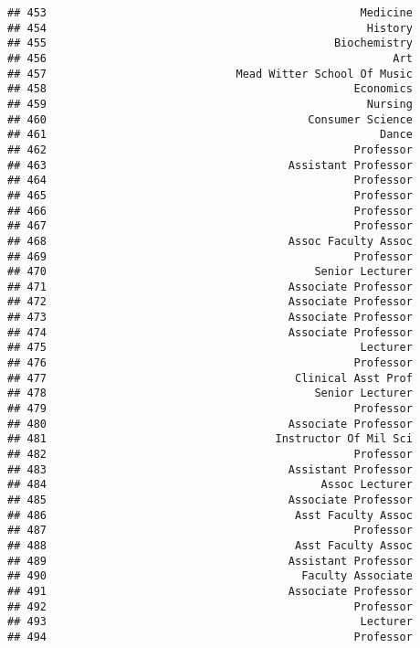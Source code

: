 \documentclass[
]{article}
\begin{document}
\begin{verbatim}
## 453                                                Medicine
## 454                                                 History
## 455                                            Biochemistry
## 456                                                     Art
## 457                             Mead Witter School Of Music
## 458                                               Economics
## 459                                                 Nursing
## 460                                        Consumer Science
## 461                                                   Dance
## 462                                               Professor
## 463                                     Assistant Professor
## 464                                               Professor
## 465                                               Professor
## 466                                               Professor
## 467                                               Professor
## 468                                     Assoc Faculty Assoc
## 469                                               Professor
## 470                                         Senior Lecturer
## 471                                     Associate Professor
## 472                                     Associate Professor
## 473                                     Associate Professor
## 474                                     Associate Professor
## 475                                                Lecturer
## 476                                               Professor
## 477                                      Clinical Asst Prof
## 478                                         Senior Lecturer
## 479                                               Professor
## 480                                     Associate Professor
## 481                                   Instructor Of Mil Sci
## 482                                               Professor
## 483                                     Assistant Professor
## 484                                          Assoc Lecturer
## 485                                     Associate Professor
## 486                                      Asst Faculty Assoc
## 487                                               Professor
## 488                                      Asst Faculty Assoc
## 489                                     Assistant Professor
## 490                                       Faculty Associate
## 491                                     Associate Professor
## 492                                               Professor
## 493                                                Lecturer
## 494                                               Professor

\end{verbatim}
\end{document}
